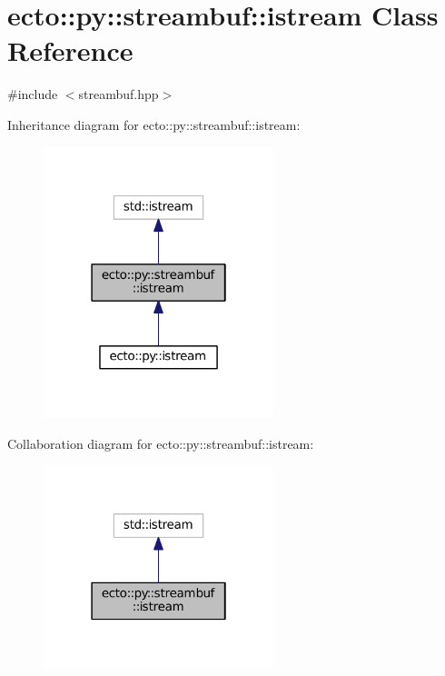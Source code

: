 \hypertarget{classecto_1_1py_1_1streambuf_1_1istream}{\section{ecto\-:\-:py\-:\-:streambuf\-:\-:istream Class Reference}
\label{classecto_1_1py_1_1streambuf_1_1istream}
}


{\ttfamily \#include $<$streambuf.\-hpp$>$}



Inheritance diagram for ecto\-:\-:py\-:\-:streambuf\-:\-:istream\-:\nopagebreak
\begin{figure}[H]
\begin{center}
\leavevmode
\includegraphics[width=190pt]{classecto_1_1py_1_1streambuf_1_1istream__inherit__graph}
\end{center}
\end{figure}


Collaboration diagram for ecto\-:\-:py\-:\-:streambuf\-:\-:istream\-:\nopagebreak
\begin{figure}[H]
\begin{center}
\leavevmode
\includegraphics[width=190pt]{classecto_1_1py_1_1streambuf_1_1istream__coll__graph}
\end{center}
\end{figure}
